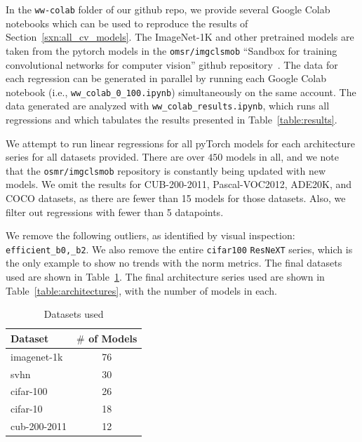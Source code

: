In the \texttt{ww-colab} folder of our github repo, we provide several Google Colab notebooks which can be used to reproduce the results of Section~\ref{sxn:all_cv_models}.
The ImageNet-1K and other pretrained models are taken from the pytorch models in the \texttt{omsr/imgclsmob} 
``Sandbox for training convolutional networks for computer vision'' github repository~\cite{osmr}.
The data for each regression can be generated in parallel by running each Google Colab notebook (i.e., \texttt{ww\_colab\_0\_100.ipynb}) simultaneously on the same account.
The data generated are analyzed with \texttt{ww\_colab\_results.ipynb}, which runs all regressions and which tabulates the results presented in Table~\ref{table:results}.

We attempt to run linear regressions for all pyTorch models for each architecture series for all datasets provided.  
There are over $450$ models in all, and we note that the \texttt{osmr/imgclsmob} repository is constantly being updated with new models.
We omit the results for CUB-200-2011, Pascal-VOC2012, ADE20K, and COCO datasets, as there are fewer than 15 models for those datasets.  
Also, we filter out regressions with fewer than 5 datapoints.

We remove the following outliers, as identified by visual inspection: \texttt{efficient\_b0,\_b2}.
We also remove the entire \texttt{cifar100} \texttt{ResNeXT} series, which is the only example to show no trends with the norm metrics.
The final datasets used are shown in Table~\ref{table:datasets}.
The final architecture series used are shown in  Table~\ref{table:architectures}, with the number of models in each.

\begin{table}[t]
\small
\begin{center}
\begin{tabular}{|p{1in}|c|}
\hline
Dataset & $\#$ of Models \\
\hline
imagenet-1k   &  76 \\
svhn          &  30 \\
cifar-100     &  26 \\
cifar-10      &  18 \\
cub-200-2011  &  12 \\
\hline
\end{tabular}
\end{center}
\caption{Datasets used}
\label{table:datasets}
\end{table}

